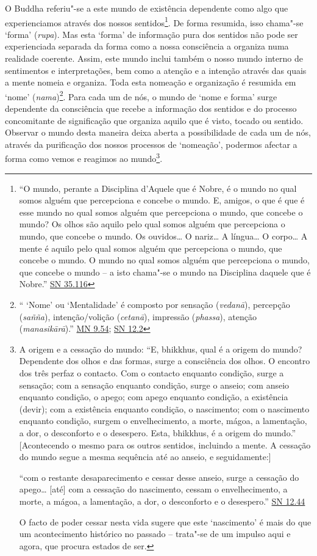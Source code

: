 O Buddha referiu"-se a este mundo de existência dependente como algo que experienciamos através dos nossos sentidos\footnote{``O mundo, perante a Disciplina d'Aquele que é Nobre, é o mundo no qual somos alguém que percepciona e concebe o mundo. E, amigos, o que é que é esse mundo no qual somos alguém que percepciona o mundo, que concebe o mundo? Os olhos são aquilo pelo qual somos alguém que percepciona o mundo, que concebe o mundo. Os ouvidos\ldots{} O nariz\ldots{} A língua\ldots{} O corpo\ldots{} A mente é aquilo pelo qual somos alguém que percepciona o mundo, que concebe o mundo. O mundo no qual somos alguém que percepciona o mundo, que concebe o mundo -- a isto chama"-se o mundo na Disciplina daquele que é Nobre.'' \href{https://suttacentral.net/sn35.116/en/bodhi}{SN 35.116}}. De forma resumida, isso chama"-se `forma' (\emph{rupa}). Mas esta `forma' de informação pura dos sentidos não pode ser experienciada separada da forma como a nossa consciência a organiza numa realidade coerente. Assim, este mundo inclui também o nosso mundo interno de sentimentos e interpretações, bem como a atenção e a intenção através das quais a mente nomeia e organiza. Toda esta nomeação e organização é resumida em `nome' (\emph{nama})\footnote{`` `Nome' ou `Mentalidade' é composto por sensação (\emph{vedanā}), percepção (\emph{sañña}), intenção/volição (\emph{cetanā}), impressão (\emph{phassa}), atenção (\emph{manasikārā}).'' \href{https://suttacentral.net/mn9/en/bodhi}{MN 9.54}; \href{https://suttacentral.net/sn12.2/en/bodhi}{SN 12.2}}. Para cada um de nós, o mundo de `nome e forma' surge dependente da consciência que recebe a informação dos sentidos e do processo concomitante de significação que organiza aquilo que é visto, tocado ou sentido. Observar o mundo desta maneira deixa aberta a possibilidade de cada um de nós, através da purificação dos nossos processos de `nomeação', podermos afectar a forma como vemos e reagimos ao mundo\footnote{A origem e a cessação do mundo: ``E, bhikkhus, qual é a origem do mundo? Dependente dos olhos e das formas, surge a consciência dos olhos. O encontro dos três perfaz o contacto. Com o contacto enquanto condição, surge a sensação; com a sensação enquanto condição, surge o anseio; com anseio enquanto condição, o apego; com apego enquanto condição, a existência (devir); com a existência enquanto condição, o nascimento; com o nascimento enquanto condição, surgem o envelhecimento, a morte, mágoa, a lamentação, a dor, o desconforto e o desespero. Esta, bhikkhus, é a origem do mundo.'' {[}Acontecendo o mesmo para os outros sentidos, incluindo a mente. A cessação do mundo segue a mesma sequência até ao anseio, e seguidamente:{]}

  ``com o restante desaparecimento e cessar desse anseio, surge a cessação do apego\ldots{} {[}até{]} com a cessação do nascimento, cessam o envelhecimento, a morte, a mágoa, a lamentação, a dor, o desconforto e o desespero.'' \href{https://suttacentral.net/sn12.44/en/bodhi}{SN 12.44}

  O facto de poder cessar nesta vida sugere que este `nascimento' é mais do que um acontecimento histórico no passado -- trata"-se de um impulso aqui e agora, que procura estados de ser.}.

